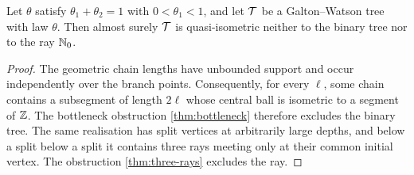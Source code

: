 \begin{theorem}
\label{thm:converse}
\leanok
{}
Let $\theta$ satisfy $\theta_1+\theta_2=1$ with $0<\theta_1<1$, and let $\mathcal{T}$ be a
Galton--Watson tree with law $\theta$. Then almost surely $\mathcal{T}$ is quasi-isometric neither to
the binary tree nor to the ray $\mathbb{N}_0$.
\end{theorem}

\begin{proof}
\leanok
{}
The geometric chain lengths have unbounded support and occur independently over the branch
points. Consequently, for every $\ell$, some chain contains a subsegment of length $2\ell$ whose
central ball is isometric to a segment of $\mathbb{Z}$. The bottleneck obstruction
\cref{thm:bottleneck} therefore excludes the binary tree. The same realisation has split vertices
at arbitrarily large depths, and below a split below a split it contains three rays meeting only
at their common initial vertex. The obstruction \cref{thm:three-rays} excludes the ray.
\end{proof}
